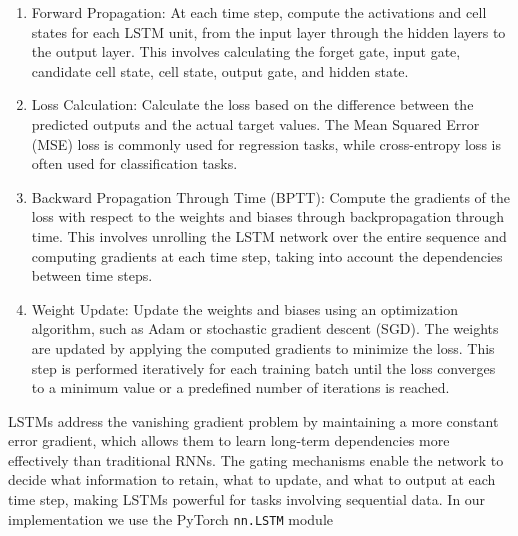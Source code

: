 \documentclass{article}
\begin{document}
    \begin{enumerate}[label={(\arabic*)}]
        \item {Forward Propagation}: At each time step, compute the activations and cell states for each LSTM unit, from the input layer through the hidden layers to the output layer. This involves calculating the forget gate, input gate, candidate cell state, cell state, output gate, and hidden state.
    
        \item {Loss Calculation}: Calculate the loss based on the difference between the predicted outputs and the actual target values. The Mean Squared Error (MSE) loss is commonly used for regression tasks, while cross-entropy loss is often used for classification tasks.
    
        \item {Backward Propagation Through Time (BPTT)}: Compute the gradients of the loss with respect to the weights and biases through backpropagation through time. This involves unrolling the LSTM network over the entire sequence and computing gradients at each time step, taking into account the dependencies between time steps.
    
        \item {Weight Update}: Update the weights and biases using an optimization algorithm, such as Adam or stochastic gradient descent (SGD). The weights are updated by applying the computed gradients to minimize the loss. This step is performed iteratively for each training batch until the loss converges to a minimum value or a predefined number of iterations is reached.
    \end{enumerate}

    LSTMs address the vanishing gradient problem by maintaining a more constant error gradient, which allows them to learn long-term dependencies more effectively than traditional RNNs. The gating mechanisms enable the network to decide what information to retain, what to update, and what to output at each time step, making LSTMs powerful for tasks involving sequential data. In our implementation we use the PyTorch \texttt{nn.LSTM} module
\end{document}
